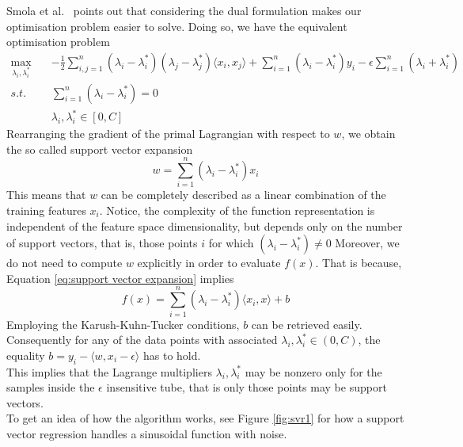 Smola et al.\ \cite{smola2004tutorial} points out that considering the dual formulation makes our optimisation problem easier to solve. Doing so, we have the equivalent optimisation problem
\begin{equation}
    \begin{aligned}
        \max_{\lambda_i, \lambda_i^*} \quad& -\frac{1}{2}\sum\limits_{i,j=1}^n(\lambda_i-\lambda_i^*)(\lambda_j-\lambda_j^*)\langle x_i,x_j\rangle +\sum\limits_{i=1}^n(\lambda_i-\lambda_i^*)y_i-\epsilon \sum\limits_{i=1}^n(\lambda_i+\lambda_i^*)
        \\
        s.t. \quad& \sum\limits_{i=1}^n(\lambda_i-\lambda_i^*)=0
        \\
        \quad& \lambda_i, \lambda_i^* \in [0, C]
    \end{aligned}
\end{equation}
Rearranging the gradient of the primal Lagrangian with respect to $w$, we obtain the so called support vector expansion
\begin{equation}\label{eq:support vector expansion}
    w=\sum\limits_{i=1}^n(\lambda_i-\lambda_i^*)x_i
\end{equation}
This means that $w$ can be completely described as a linear combination of the training features $x_i$.
Notice, the complexity of the function representation is independent of the feature space dimensionality, but depends only on the number of support vectors, that is, those points $i$ for which $(\lambda_i-\lambda_i^*)\neq 0$
Moreover, we do not need to compute $w$ explicitly in order to evaluate $f(x)$.
That is because, Equation \ref{eq:support vector expansion} implies
\begin{equation}
    f(x)=\sum\limits_{i=1}^n(\lambda_i-\lambda_i^*)\langle x_i, x\rangle +b
\end{equation}
Employing the Karush-Kuhn-Tucker conditions, $b$ can be retrieved easily. 
Consequently for any of the data points with associated $\lambda_i, \lambda^*_i \in (0,C)$, the equality $b=y_i-\langle w, x_i-\epsilon\rangle$ has to hold.
\\
This implies that the Lagrange multipliers $\lambda_i, \lambda_i^*$ may be nonzero only for the samples inside the $\epsilon$ insensitive tube, that is only those points may be support vectors. 
\\
To get an idea of how the algorithm works, see Figure \ref{fig:svr1} for how a support vector regression handles a sinusoidal function with noise.
